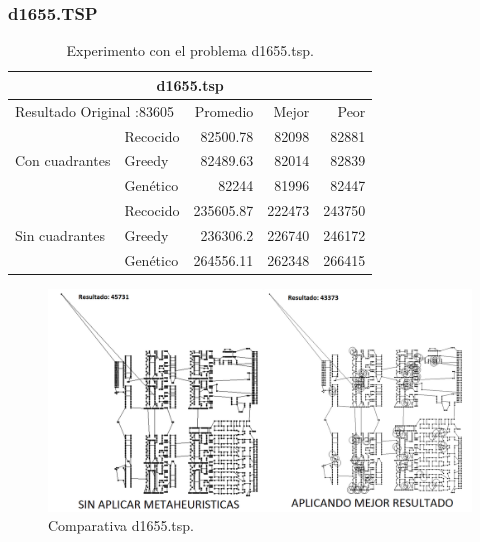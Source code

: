 \subsubsection{d1655.TSP}
\begin{table}[hbtp]
 \centering 
    \caption{Experimento con el problema d1655.tsp.} 
	\begin{tabular}{ | l   l | r | r | r |   }
         \hline\multicolumn{5}{|c|}{ \rowcolor[gray]{0.8}d1655.tsp} \\ \hline
         \multicolumn{2}{|l|}{Resultado Original :83605}  & Promedio & Mejor & Peor \\ 
                \hline
                & Recocido  & 82500.78 & 82098 & 82881 \\ 
 Con cuadrantes & Greedy    & 82489.63 & 82014 & 82839 \\ 
                & Genético  & \cellcolor[gray]{0.9} 82244 & \cellcolor[gray]{0.9} 81996 & \cellcolor[gray]{0.9} 82447 \\ 
                \hline
                & Recocido  & 235605.87 & \cellcolor[gray]{0.9} 222473 & \cellcolor[gray]{0.9} 243750 \\ 
 Sin cuadrantes & Greedy    & 236306.2 & 226740 & 246172 \\ 
                & Genético  & \cellcolor[gray]{0.9} 264556.11 & 262348 & 266415 \\ 
                \hline
    \end{tabular}
    \label{table:EXP_d1655.tsp}
\end{table}
\begin{figure}[hbtp]
    \centering
        \includegraphics[width=1\textwidth]{PruebasResultados/Experimentos_Comparativas/d1655.png}
        \caption{Comparativa d1655.tsp.}
        \label{fig:d1655_comparativa.png}
\end{figure}
